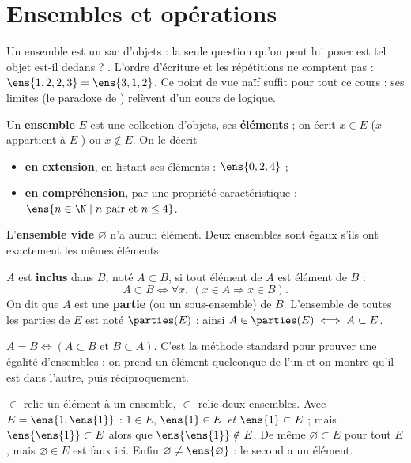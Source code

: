 \section{Ensembles et opérations}
\begin{intuition}
Un ensemble est un \og sac \fg{} d'objets : la seule question qu'on peut lui poser est \og tel objet est-il dedans ? \fg. L'ordre d'écriture et les répétitions ne comptent pas : $\ens{1,2,2,3}=\ens{3,1,2}$. Ce point de vue \og naïf \fg{} suffit pour tout ce cours ; ses limites (le paradoxe de ) relèvent d'un cours de logique.
\end{intuition}
\begin{definition}
Un \textbf{ensemble} $E$ est une collection d'objets, ses \textbf{éléments} ; on écrit $x\in E$ (\og $x$ appartient à $E$ \fg) ou $x\notin E$. On le décrit
\begin{itemize}
\item \textbf{en extension}, en listant ses éléments : $\ens{0,2,4}$ ;
\item \textbf{en compréhension}, par une propriété caractéristique : $\ens{n\in\N \mid n \text{ pair et } n\le 4}$.
\end{itemize}
L'\textbf{ensemble vide} $\varnothing$ n'a aucun élément. Deux ensembles sont égaux s'ils ont exactement les mêmes éléments.
\end{definition}
\begin{definition}\label{def-inclusion}
$A$ est \textbf{inclus} dans $B$, noté $A\subset B$, si tout élément de $A$ est élément de $B$ :
\[A\subset B \iff \forall x,\ (x\in A\Rightarrow x\in B).\]
On dit que $A$ est une \textbf{partie} (ou un sous-ensemble) de $B$. L'ensemble de toutes les parties de $E$ est noté $\parties(E)$ : ainsi $A\in\parties(E)\iff A\subset E$.
\end{definition}
\begin{essentiel}
$A=B \iff (A\subset B \text{ et } B\subset A)$. C'est la méthode standard pour prouver une égalité d'ensembles : on prend un élément quelconque de l'un et on montre qu'il est dans l'autre, puis réciproquement.
\end{essentiel}
\begin{attention}
$\in$ relie un élément à un ensemble, $\subset$ relie deux ensembles. Avec $E=\ens{1,\ens{1}}$ : $1\in E$, $\ens{1}\in E$ \emph{et} $\ens{1}\subset E$ ; mais $\ens{\ens{1}}\subset E$ alors que $\ens{\ens{1}}\notin E$. De même $\varnothing\subset E$ pour tout $E$, mais $\varnothing\in E$ est faux ici. Enfin $\varnothing\neq\ens{\varnothing}$ : le second a un élément.
\end{attention}
